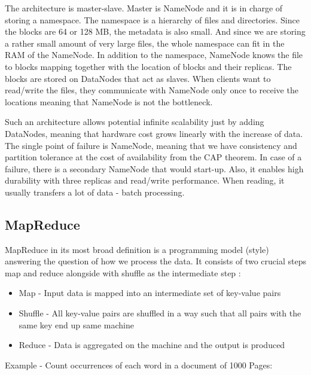 The architecture is master-slave. Master is NameNode and it is in charge of storing a namespace. The namespace is a hierarchy of files and directories. Since the blocks are 64 or 128 MB, the metadata is also small. And since we are storing a rather small amount of very large files, the whole namespace can fit in the RAM of the NameNode. In addition to the namespace, NameNode knows the file to blocks mapping together with the location of blocks and their replicas. The blocks are stored on DataNodes that act as slaves. When clients want to read/write the files, they communicate with NameNode only once to receive the locations meaning that NameNode is not the bottleneck. 

Such an architecture allows potential infinite scalability just by adding DataNodes, meaning that hardware cost grows linearly with the increase of data. The single point of failure is NameNode, meaning that we have consistency and partition tolerance at the cost of availability from the CAP theorem. In case of a failure, there is a secondary NameNode that would start-up. Also, it enables high durability with three replicas and read/write performance. When reading, it usually transfers a lot of data - batch processing.

\subsection{MapReduce}
MapReduce \cite{MapReduce} in its most broad definition is a programming model (style) answering the question of how we process the data. It consists of two crucial steps map and reduce alongside with shuffle as the intermediate step \cite{BigDataCourse}: %
\begin{itemize}
	\item Map - Input data is mapped into an intermediate set of key-value pairs
	\item Shuffle - All key-value pairs are shuffled in a way such that all pairs with the same key end up same machine
	\item Reduce - Data is aggregated on the machine and the output is produced
\end{itemize}
Example - Count occurrences of each word in a document of 1000 Pages:

